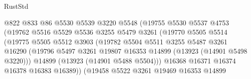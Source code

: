 \begin{lexlean}{RustStd}
\begin{coremodule}
                                    @822
                                    @833
                                    @86
                                    @5530
                                    @5539
                                    @3220
                                    @5548
                                    (@19755
                                      @5530
                                      @5537
                                      @4753
                                      (@19762
                                        @5516
                                        @5529
                                        @5536
                                        @3255
                                        @5479
                                        @3261
                                        (@19770
                                          @5505
                                          @5514
                                          (@19775
                                            @5505
                                            @5512
                                            @3903
                                            (@19782
                                              @5504
                                              @5511
                                              @3255
                                              @5487
                                              @3261
                                              @16290
                                              (@19796
                                                @5497
                                                @3261
                                                @19807
                                                @16353
                                                @14899
                                                (@13923 (@14901 @5498 @3220)))
                                              @14899
                                              (@13923 (@14901 @5488 @5504)))
                                            @16368
                                            @16371
                                            @16374
                                            @16378
                                            @16383
                                            @16389))
                                        (@19458
                                          @5522
                                          @3261
                                          @19469
                                          @16353
                                          @14899

\end{coremodule}
\end{lexlean}
